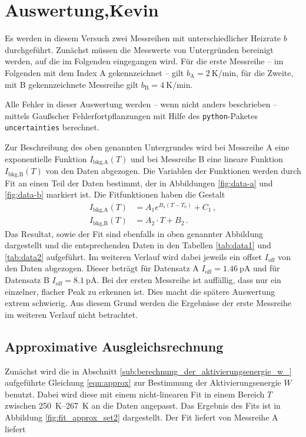 \section{Auswertung,Kevin}
Es werden in diesem Versuch zwei Messreihen mit unterschiedlicher Heizrate
$b$ durchgeführt. Zunächst müssen die Messwerte von Untergründen bereinigt
werden, auf die im Folgenden eingegangen wird.
Für die erste Messreihe -- im Folgenden mit dem Index A gekennzeichnet --
gilt $b_\text{A} = \SI{2}{\kelvin\per\minute}$, für die Zweite, mit B
gekennzeichnete Messreihe gilt $b_\text{B} = \SI{4}{\kelvin\per\minute}$.

Alle Fehler in dieser Auswertung werden -- wenn nicht anders beschrieben --
mittels Gaußscher Fehlerfortpflanzungen mit Hilfe des \texttt{python}-Paketes
\texttt{uncertainties} \cite{py-uncertainties} berechnet.

Zur Beschreibung des oben genannten Untergrundes wird bei Messreihe A eine
exponentielle Funktion $I_\text{bkg,A}(T)$ und bei Messreihe B eine lineare
Funktion
$I_\text{bkg,B}(T)$ von den Daten abgezogen. Die Variablen der Funktionen werden
durch Fit an einen Teil der Daten bestimmt, der in Abbildungen
\ref{fig:data-a} und \ref{fig:data-b} markiert ist.
Die Fitfunktionen haben die Gestalt
\begin{align*}
    I_\text{bkg,A}(T) &= A_1 e^{B_1 (T-T_0)} + C_1\,,\\
    I_\text{bkg,B}(T) &= A_2\cdot T + B_2\,.
\end{align*}
Das Resultat, sowie der Fit sind ebenfalls in oben genannter Abbildung
dargestellt und die entsprechenden Daten in den Tabellen \ref{tab:data1} und
\ref{tab:data2} aufgeführt.
Im weiteren Verlauf wird dabei jeweils ein offset $I_\text{off}$ von den Daten
abgezogen. Dieser beträgt für Datensatz A $I_\text{off} = \SI{1.46}{\pico\ampere}$
und für Datensatz B $I_\text{off} = \SI{8.1}{\pico\ampere}$.
Bei der ersten Messreihe ist auffällig, dass nur ein einzelner, flacher Peak
zu erkennen ist. Dies macht die spätere Auswertung extrem schwierig.
Aus diesem Grund werden die Ergebnisse der erste Messreihe im weiteren
Verlauf nicht betrachtet.

\subsection{Approximative Ausgleichsrechnung}
\label{subsec:approx}
Zunächst wird die in Abschnitt \ref{sub:berechnung_der_aktivierungsenergie_w_}
aufgeführte Gleichung \ref{eqn:approx} zur Bestimmung der Aktivierungsenergie
$W$ benutzt. Dabei wird diese mit einem nicht-linearen Fit in einem Bereich
$T$ zwischen \SIrange{250}{267}{\kelvin} an die Daten angepasst.
Das Ergebnis des Fits ist in Abbildung \ref{fig:fit_approx_set2} dargestellt.
Der Fit liefert von Messreihe A liefert



